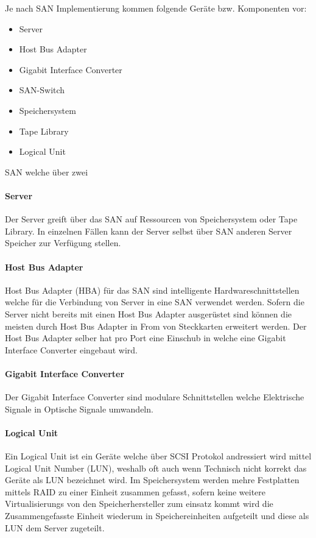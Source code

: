Je nach SAN Implementierung kommen folgende Geräte bzw. Komponenten vor:
\begin{itemize}
\item Server
\item Host Bus Adapter
\item Gigabit Interface Converter
\item SAN-Switch
\item Speichersystem
\item Tape Library
\item Logical Unit
\end{itemize}

SAN welche über zwei

\paragraph*{Server} 
Der Server greift über das SAN auf Ressourcen von Speichersystem oder Tape Library. In einzelnen Fällen kann der Server selbst über SAN anderen Server Speicher zur Verfügung stellen.

\paragraph*{Host Bus Adapter}
Host Bus Adapter (HBA) für das SAN sind intelligente Hardwareschnittstellen welche für die Verbindung von Server in eine SAN verwendet werden. Sofern die Server nicht bereits mit einen Host Bus Adapter ausgerüstet sind können die meisten durch Host Bus Adapter in From von Steckkarten erweitert werden. Der Host Bus Adapter selber hat pro Port eine Einschub in welche eine Gigabit Interface Converter eingebaut wird. \cite{Christopher2009}

\paragraph*{Gigabit Interface Converter}
Der Gigabit Interface Converter sind modulare Schnittstellen welche Elektrische Signale in Optische Signale umwandeln.\cite{SNIA2011}

\paragraph*{Logical Unit}
Ein Logical Unit ist ein Geräte welche über SCSI Protokol andressiert wird mittel Logical Unit Number (LUN), weshalb oft auch wenn Technisch nicht korrekt das Geräte als LUN bezeichnet wird. Im Speichersystem werden mehre Festplatten mittels RAID zu einer Einheit zusammen gefasst, sofern keine weitere Virtualisierungs von den Speicherhersteller zum einsatz kommt wird die Zusammengefasste Einheit wiederum in Speichereinheiten aufgeteilt und diese als LUN dem Server zugeteilt.\cite{SNIA2011}


